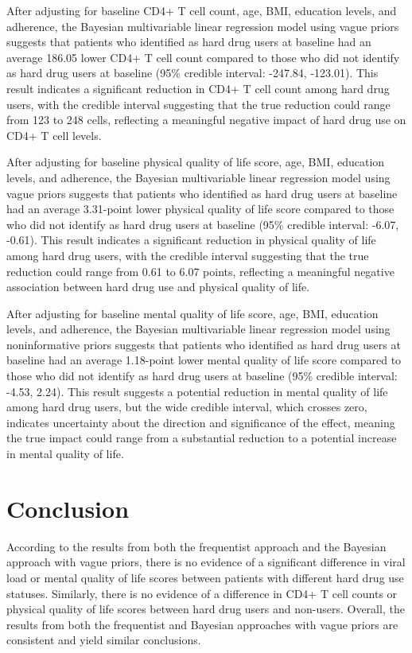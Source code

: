 \documentclass[
  12pt,
]{article}
\begin{document}
After adjusting for baseline CD4+ T cell count, age, BMI, education
levels, and adherence, the Bayesian multivariable linear regression
model using vague priors suggests that patients who identified as hard
drug users at baseline had an average 186.05 lower CD4+ T cell count
compared to those who did not identify as hard drug users at baseline
(95\% credible interval: -247.84, -123.01). This result indicates a
significant reduction in CD4+ T cell count among hard drug users, with
the credible interval suggesting that the true reduction could range
from 123 to 248 cells, reflecting a meaningful negative impact of hard
drug use on CD4+ T cell levels.

After adjusting for baseline physical quality of life score, age, BMI,
education levels, and adherence, the Bayesian multivariable linear
regression model using vague priors suggests that patients who
identified as hard drug users at baseline had an average 3.31-point
lower physical quality of life score compared to those who did not
identify as hard drug users at baseline (95\% credible interval: -6.07,
-0.61). This result indicates a significant reduction in physical
quality of life among hard drug users, with the credible interval
suggesting that the true reduction could range from 0.61 to 6.07 points,
reflecting a meaningful negative association between hard drug use and
physical quality of life.

After adjusting for baseline mental quality of life score, age, BMI,
education levels, and adherence, the Bayesian multivariable linear
regression model using noninformative priors suggests that patients who
identified as hard drug users at baseline had an average 1.18-point
lower mental quality of life score compared to those who did not
identify as hard drug users at baseline (95\% credible interval: -4.53,
2.24). This result suggests a potential reduction in mental quality of
life among hard drug users, but the wide credible interval, which
crosses zero, indicates uncertainty about the direction and significance
of the effect, meaning the true impact could range from a substantial
reduction to a potential increase in mental quality of life.

\hypertarget{conclusion}{%
\section{Conclusion}\label{conclusion}}

According to the results from both the frequentist approach and the
Bayesian approach with vague priors, there is no evidence of a
significant difference in viral load or mental quality of life scores
between patients with different hard drug use statuses. Similarly, there
is no evidence of a difference in CD4+ T cell counts or physical quality
of life scores between hard drug users and non-users. Overall, the
results from both the frequentist and Bayesian approaches with vague
priors are consistent and yield similar conclusions.
\end{document}
